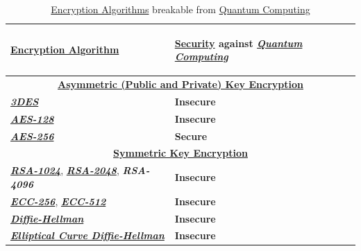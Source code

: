 \documentclass[conference]{IEEEtran}
\begin{document}
\begin{table}[!hp]
\centering
    \caption{\href{https://en.wikipedia.org/wiki/Encryption}{Encryption Algorithms} breakable from \href{https://en.wikipedia.org/wiki/Quantum_computing}{Quantum Computing}}
    \begin{tabular}{ |p{4cm}|p{2.5cm}| }
     \hline
     \begin{center}
     \textbf{\href{https://en.wikipedia.org/wiki/Encryption}{Encryption Algorithm}}\end{center} & \begin{center}\textbf{\href{https://en.wikipedia.org/wiki/Computer_security}{Security} against \href{https://en.wikipedia.org/wiki/Quantum_computing}{\textit{Quantum Computing}}}\end{center}\\
     \hline
     \hline
     \multicolumn{2}{|c|}{\textbf{\href{https://en.wikipedia.org/wiki/Public-key_cryptography}{Asymmetric (Public and Private) Key Encryption}}} \\
     \hline
     \hline
     \textit{\textbf{\href{https://en.wikipedia.org/wiki/Triple_DES}{3DES}}} & \textbf{Insecure} \\
     \hline
     \textit{\textbf{\href{https://en.wikipedia.org/wiki/Advanced_Encryption_Standard}{AES-128}}} & \textbf{Insecure} \\
     \hline
     \textit{\textbf{\href{https://en.wikipedia.org/wiki/Advanced_Encryption_Standard}{AES-256}}} & \textbf{Secure} \\
     \hline
     \hline
     \multicolumn{2}{|c|}{\textbf{\href{https://en.wikipedia.org/wiki/Symmetric-key_algorithm}{Symmetric Key Encryption}}} \\
     \hline
     \hline
     \textit{\textbf{\href{https://en.wikipedia.org/wiki/RSA_(cryptosystem)}{RSA-1024}}}, \textit{\textbf{\href{https://en.wikipedia.org/wiki/RSA_(cryptosystem)}{RSA-2048}}}, \textit{\textbf{RSA-4096}} & \textbf{Insecure} \\
     \hline
     \textit{\textbf{\href{https://en.wikipedia.org/wiki/Elliptic-curve_cryptography}{ECC-256}}}, \textit{\textbf{\href{https://en.wikipedia.org/wiki/Elliptic-curve_cryptography}{ECC-512}}} & \textbf{Insecure} \\
     \hline
     \textit{\textbf{\href{https://en.wikipedia.org/wiki/Diffie\%E2\%80\%93Hellman_key_exchange}{Diffie-Hellman}}} & \textbf{Insecure} \\
     \hline
     \textit{\textbf{\href{https://en.wikipedia.org/wiki/Elliptic-curve_Diffie\%E2\%80\%93Hellman}{Elliptical Curve Diffie-Hellman}}} & \textbf{Insecure} \\
     \hline
    \end{tabular}
\end{table}
\end{document}
